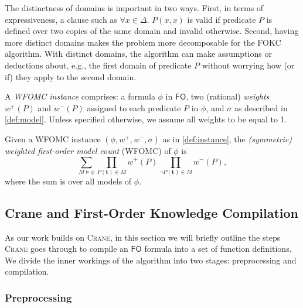 \documentclass[a4paper,UKenglish,cleveref, autoref, thm-restate]{lipics-v2021}
\newcommand{\FO}{$\mathsf{FO}$}
\begin{document}
\begin{remark*}
  The distinctness of domains is important in two ways. First, in terms of
  expressiveness, a clause such as $\forall x \in \Delta\text{. }P(x, x)$ is
  valid if predicate $P$ is defined over two copies of the same domain and
  invalid otherwise. Second, having more distinct domains makes the problem more
  decomposable for the FOKC algorithm. With distinct domains, the algorithm can
  make assumptions or deductions about, e.g., the first domain of predicate $P$
  without worrying how (or if) they apply to the second domain.
\end{remark*}

\begin{definition}\label{def:instance}
  A \emph{WFOMC instance} comprises: a formula $\phi$ in \FO{}, two (rational)
  \emph{weights} $w^{+}(P)$ and $w^{-}(P)$ assigned to each predicate $P$ in
  $\phi$, and $\sigma$ as described in \cref{def:model}. Unless specified
  otherwise, we assume all weights to be equal to 1.
\end{definition}

\begin{definition}
  Given a WFOMC instance $(\phi, w^{+}, w^{-}, \sigma)$ as in
  \cref{def:instance}, the \emph{(symmetric) weighted first-order model count}
  (WFOMC) of $\phi$ is
  \begin{equation}\label{eq:wfomc}
    \sum_{M \models \phi} \prod_{P(\mathbf{t}) \in M} w^{+}(P) \prod_{\neg P(\mathbf{t}) \in M} w^{-}(P),
  \end{equation}
  where the sum is over all models of $\phi$.
\end{definition}

\subsection{Crane and First-Order Knowledge Compilation}\label{sec:crane}


As our work builds on \textsc{Crane}, in this section we will briefly outline
the steps \textsc{Crane} goes through to compile an \FO{} formula into a set of
function definitions. We divide the inner workings of the algorithm into two
stages: preprocessing and compilation.

\subsubsection{Preprocessing}
\end{document}
